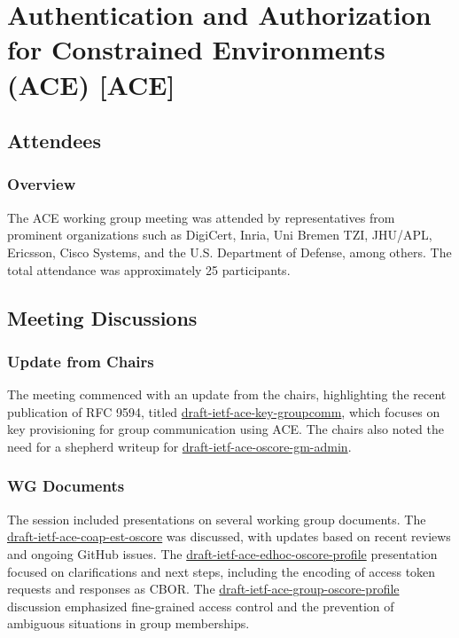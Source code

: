 \documentclass{article}
\begin{document}
\newpage

\section{Authentication and Authorization for Constrained Environments (ACE) [ACE]}

\subsection{Attendees}

\subsubsection{Overview}
The ACE working group meeting was attended by representatives from prominent organizations such as DigiCert, Inria, Uni Bremen TZI, JHU/APL, Ericsson, Cisco Systems, and the U.S. Department of Defense, among others. The total attendance was approximately 25 participants.


\subsection{Meeting Discussions}

\subsubsection{Update from Chairs}
The meeting commenced with an update from the chairs, highlighting the recent publication of RFC 9594, titled \href{https://datatracker.ietf.org/doc/html/draft-ietf-ace-key-groupcomm}{draft-ietf-ace-key-groupcomm}, which focuses on key provisioning for group communication using ACE. The chairs also noted the need for a shepherd writeup for \href{https://datatracker.ietf.org/doc/html/draft-ietf-ace-oscore-gm-admin}{draft-ietf-ace-oscore-gm-admin}.

\subsubsection{WG Documents}
The session included presentations on several working group documents. The \href{https://datatracker.ietf.org/doc/html/draft-ietf-ace-coap-est-oscore}{draft-ietf-ace-coap-est-oscore} was discussed, with updates based on recent reviews and ongoing GitHub issues. The \href{https://datatracker.ietf.org/doc/html/draft-ietf-ace-edhoc-oscore-profile}{draft-ietf-ace-edhoc-oscore-profile} presentation focused on clarifications and next steps, including the encoding of access token requests and responses as CBOR. The \href{https://datatracker.ietf.org/doc/html/draft-ietf-ace-group-oscore-profile}{draft-ietf-ace-group-oscore-profile} discussion emphasized fine-grained access control and the prevention of ambiguous situations in group memberships.
\end{document}

